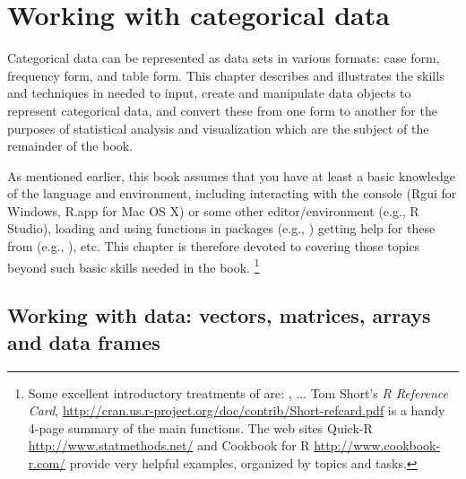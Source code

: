 \documentclass[10pt,krantz2]{krantz}\usepackage[]{graphicx}\usepackage[]{color}
\begin{document}
\chapter{Working with categorical data}\label{ch:working}



Categorical data can be represented as data sets
in various formats:
case form, frequency form, and table form.  This chapter
describes and illustrates the skills and techniques in \R
needed to input, create and manipulate \R data objects
to represent categorical data, and convert these from one
form to another for the purposes of statistical analysis
and visualization which are the subject of the remainder of the book.

As mentioned earlier, this book assumes that you have at least a
basic knowledge of the \R language and environment, including
interacting with the \R console (Rgui for Windows, R.app for Mac OS X)
or some other editor/environment (e.g., R Studio),
loading and using \R functions in packages (e.g., )
getting help for these from \R (e.g., ), etc.
This chapter is therefore devoted
to covering those topics beyond such basic skills needed in the book.%
\footnote{
Some excellent introductory treatments of \R are:
\citet[]{FoxWeisberg:2011}, ...
Tom Short's \emph{R Reference Card}, \url{http://cran.us.r-project.org/doc/contrib/Short-refcard.pdf} is a handy 4-page summary of the main functions.
The web sites
Quick-R \url{http://www.statmethods.net/} and
Cookbook for R \url{http://www.cookbook-r.com/}
provide very helpful examples, organized by topics and tasks.
}


\section{Working with \R data: vectors, matrices, arrays and data frames}\label{sec:Rdata}
\end{document}
